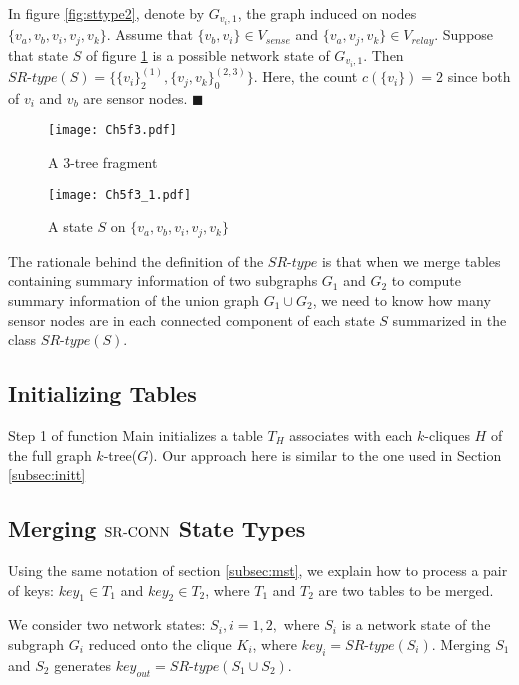 \begin{example}
\normalfont
 In figure \ref{fig:sttype2}, denote by  $G_{v_i,1}$, the graph induced on nodes $\{v_a,v_b,v_i,v_j,v_k\}$. Assume that $\{v_b,v_i\}\in V_{sense}$ and $\{v_a,v_j,v_k\} \in V_{relay}$. Suppose that state $S$ of figure \ref{fig:sttype2_node} is a possible network state of $G_{v_i,1}$. Then $SR\mbox{-}type(S)=\big \{\{v_i\}_2^{(1)},\{v_j,v_k\}_0^{(2,3)}\big\}$. Here, the count $c(\{v_i\})=2$ since both of $v_i$ and $v_b$ are sensor nodes.
 $\blacksquare$
\end{example}
\begin{figure}[!htb]
\begin{minipage}[]{0.5\linewidth}
\texttt{[image: Ch5f3.pdf]}
\caption{A 3-tree fragment}
\label{fig:sttype2}
\end{minipage}
\begin{minipage}{0.5\linewidth}
\texttt{[image: Ch5f3\_1.pdf]}
\caption{A state $S$ on $\{v_a,v_b,v_i,v_j,v_k\}$}
\label{fig:sttype2_node}
\end{minipage}
\end{figure}
The rationale behind the definition of the $SR\mbox{-}type$ is that when we merge tables containing summary information of two subgraphs $G_1$ and $G_2$ to compute summary information of the union graph $G_1\cup G_2$, we need to know  how many sensor nodes are in each connected component of each state $S$ summarized in the class $SR\mbox{-}type(S)$.


\subsection{Initializing Tables}

Step 1 of function Main initializes a table $T_H$ associates with each $k$-cliques $H$ of the full graph $k$-tree($G$). Our approach here is similar to the one used in Section \ref{subsec:initt}

\subsection{Merging ${\mathrm {SR\mbox{-}CONN}}$ State Types}
\label{subsec:msst}
Using the same notation of section \ref{subsec:mst}, we explain how to process a pair of keys: $key_1\in T_1$ and $key_2\in T_2$, where $T_1$ and $T_2$ are two tables to be merged.

We consider two network states: $S_i, i=1,2,$ where $S_i$ is a network state of the subgraph $G_i$ reduced onto the clique $K_i$, where $key_i=SR\mbox{-}type(S_i)$. Merging $S_1$ and $S_2$ generates $key_{out}=SR\mbox{-}type(S_1\cup S_2)$.

